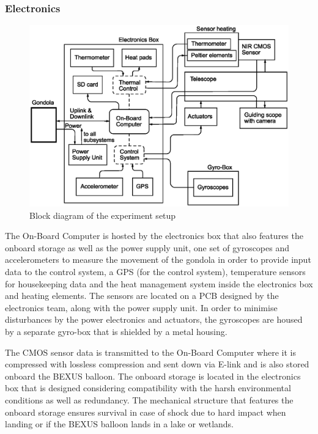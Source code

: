 \subsubsection{Electronics}

\begin{figure}[htb]
	\centering
	\includegraphics[width = \linewidth]{4-experiment-design/img/setup/Block_diagram_4-1}
	\caption{Block diagram of the experiment setup}
	\label{fig::4-1_block_diagram}
\end{figure}

The On-Board Computer is hosted by the electronics box that also features the onboard storage as well as the power supply unit, one set of gyroscopes and accelerometers to measure the movement of the gondola in order to provide input data to the control system, a GPS (for the control system), temperature sensors for housekeeping data and the heat management system inside the electronics box and heating elements. The sensors are located on a PCB designed by the electronics team, along with the power supply unit. In order to minimise disturbances by the power electronics and actuators, the gyroscopes are housed by a separate gyro-box that is shielded by a metal housing.



The CMOS sensor data is transmitted to the On-Board Computer where it is compressed with lossless compression and sent down via E-link and is also stored onboard the BEXUS balloon. The onboard storage is located in the electronics box that is designed considering compatibility with the harsh environmental conditions as well as redundancy. The mechanical structure that features the onboard storage ensures survival in case of shock due to hard impact when landing or if the BEXUS balloon lands in a lake or wetlands.

